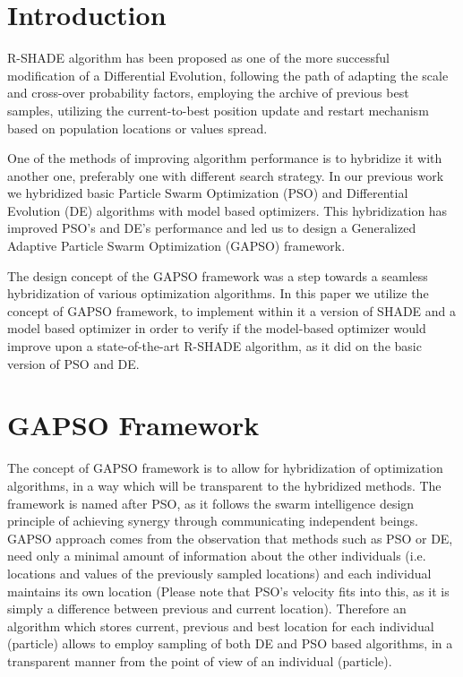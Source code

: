 \documentclass[sigconf]{acmart}
\begin{document}
\maketitle

\section{Introduction}

R-SHADE \cite{Tanabe2014} algorithm has been proposed as one of the more successful
modification of a Differential Evolution, following the path of adapting the scale
and cross-over probability factors, employing the archive of previous best samples,
utilizing the current-to-best position update and restart mechanism based on population
locations or values spread.

One of the methods of improving algorithm performance is to hybridize it with another
one, preferably one with different search strategy.
In our previous work we hybridized basic Particle Swarm Optimization (PSO) and Differential Evolution (DE) algorithms with model based optimizers.
This hybridization has improved PSO's and DE's performance \cite{zaborski2019generalized,zaborski2020analysis,Okulewicz2020} and led us to design a Generalized Adaptive Particle Swarm Optimization (GAPSO) framework\cite{ulinski2018generalized,Okulewicz2020}.

The design concept of the GAPSO framework was a step towards a seamless hybridization
of various optimization algorithms.
In this paper we utilize the concept of GAPSO framework, to implement within it a version of SHADE \cite{Tanabe2014} and a model based optimizer \cite{zaborski2020analysis} in order to verify if the model-based optimizer
would improve upon a state-of-the-art R-SHADE algorithm, as it did on
the basic version of PSO and DE.
%
\section{GAPSO Framework}
The concept of GAPSO framework is to allow for hybridization of optimization algorithms,
in a way which will be transparent to the hybridized methods.
The framework is named after PSO, as it follows the swarm intelligence design principle
of achieving synergy through communicating independent beings.
GAPSO approach comes from the observation that methods such as PSO or DE,
need only a minimal amount of information about the other individuals (i.e. locations and values of the previously sampled locations) and each individual maintains its own
location (Please note that PSO's velocity fits into this, as it is simply a difference between previous and current location).
Therefore an algorithm which stores current, previous and best location
for each individual (particle) allows to employ sampling of both DE and PSO
based algorithms, in a transparent manner from the point of view of an individual (particle).
\end{document}

